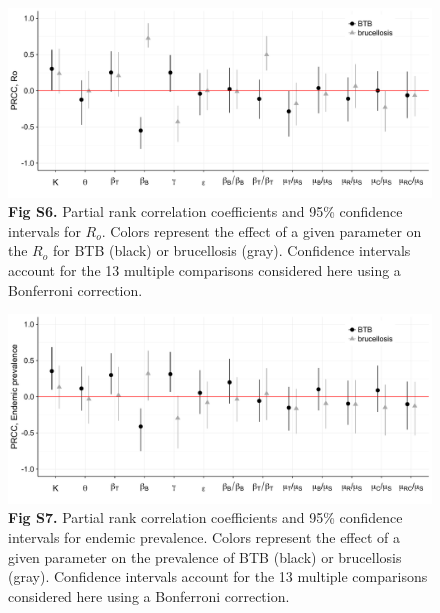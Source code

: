 \documentclass[11pt]{article}
\begin{document}
\begin{figure}[H]
  \centering
  \includegraphics[width = \textwidth]{FigureS6_LHSRo_lowres.pdf}
  \caption*{\textbf{Fig S6.} Partial rank correlation coefficients and 95\% confidence intervals for $R_o$.  Colors represent the effect of a given parameter on the $R_o$ for BTB (black) or brucellosis (gray). Confidence intervals account for the 13 multiple comparisons considered here using a Bonferroni correction.}
\end{figure}

\begin{figure}[H]
  \centering
  \includegraphics[width = \textwidth]{FigureS7_LHSPrev_lowres.pdf}
  \caption*{\textbf{Fig S7.} Partial rank correlation coefficients and 95\% confidence intervals for endemic prevalence.  Colors represent the effect of a given parameter on the prevalence of BTB (black) or brucellosis (gray). Confidence intervals account for the 13 multiple comparisons considered here using a Bonferroni correction.}
\end{figure}

\pagebreak



\end{document}
